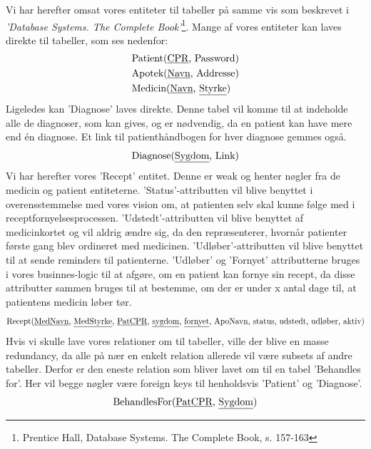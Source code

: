 Vi har herefter omsat vores entiteter til tabeller på samme vis som beskrevet i \textit{'Database Systems. The Complete Book'}\footnote{Prentice Hall, Database Systems. The Complete Book, s. 157-163}. Mange af vores entiteter kan laves direkte til tabeller, som ses nedenfor:
\begin{align*}
	&\textrm{Patient}(\textrm{\underline{CPR}, Password})\\
	&\textrm{Apotek}(\textrm{\underline{Navn}, Addresse})\\
	&\textrm{Medicin}(\textrm{\underline{Navn}, \underline{Styrke}})\\
\end{align*}
Ligeledes kan 'Diagnose' laves direkte. Denne tabel vil komme til at indeholde alle de diagnoser, som kan gives, og er nødvendig, da en patient kan have mere end én diagnose. Et link til patienthåndbogen for hver diagnose gemmes også.
\begin{equation*}
\textrm{Diagnose}(\textrm{\underline{Sygdom}, Link})
\end{equation*}
Vi har herefter vores 'Recept' entitet. Denne er weak og henter nøgler fra de medicin og patient entiteterne. 'Status'-attributten vil blive benyttet i overensstemmelse med vores vision om, at patienten selv skal kunne følge med i receptfornyelsesprocessen. 'Udstedt'-attributten vil blive benyttet af medicinkortet og vil aldrig ændre sig, da den repræsenterer, hvornår patienter første gang blev ordineret med medicinen. 'Udløber'-attributten vil blive benyttet til at sende reminders til patienterne. 'Udløber' og 'Fornyet' attributterne bruges i vores businnes-logic til at afgøre, om en patient kan fornye sin recept, da disse attributter sammen bruges til at bestemme, om der er under x antal dage til, at patientens medicin løber tør. 
\begin{equation*}
	\textrm{Recept}(\textrm{\underline{MedNavn}, \underline{MedStyrke}, \underline{PatCPR}, \underline{sygdom}, \underline{fornyet}, ApoNavn, status, udstedt, udløber, aktiv})
\end{equation*}
Hvis vi skulle lave vores relationer om til tabeller, ville der blive en masse redundancy, da alle på nær en enkelt relation allerede vil være subsets af andre tabeller. Derfor er den eneste relation som bliver lavet om til en tabel 'Behandles for'. Her vil begge nøgler være foreign keys til henholdsvis 'Patient' og 'Diagnose'.
\begin{equation*}
\textrm{BehandlesFor}(\textrm{\underline{PatCPR}, \underline{Sygdom}})
\end{equation*}
